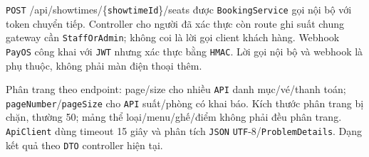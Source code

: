 \begin{landscape}
\texttt{POST} /\allowbreak{}api/\allowbreak{}showtimes/\allowbreak{}\{\texttt{showtime\allowbreak{}Id}\}/\allowbreak{}seats được \texttt{Booking\allowbreak{}Service} gọi nội bộ với token chuyển tiếp. Controller cho người đã xác thực còn route ghi suất chung gateway cần \texttt{Staff\allowbreak{}Or\allowbreak{}Admin}; không coi là lời gọi client khách hàng. Webhook \texttt{Pay\allowbreak{}OS} công khai với \texttt{JWT} nhưng xác thực bằng \texttt{HMAC}. Lời gọi nội bộ và webhook là phụ thuộc, không phải màn điện thoại thêm.

Phân trang theo endpoint: page/\allowbreak{}size cho nhiều \texttt{API} danh mục/\allowbreak{}vé/\allowbreak{}thanh toán; \texttt{page\allowbreak{}Number}/\allowbreak{}\texttt{page\allowbreak{}Size} cho \texttt{API} suất/\allowbreak{}phòng có khai báo. Kích thước phân trang bị chặn, thường 50; mảng thể loại/\allowbreak{}menu/\allowbreak{}ghế/\allowbreak{}điểm không phải đều phân trang. \texttt{Api\allowbreak{}Client} dùng timeout 15 giây và phân tích \texttt{JSON} \texttt{UTF}-8/\allowbreak{}\texttt{Problem\allowbreak{}Details}. Dạng kết quả theo \texttt{DTO} controller hiện tại.


\end{landscape}
